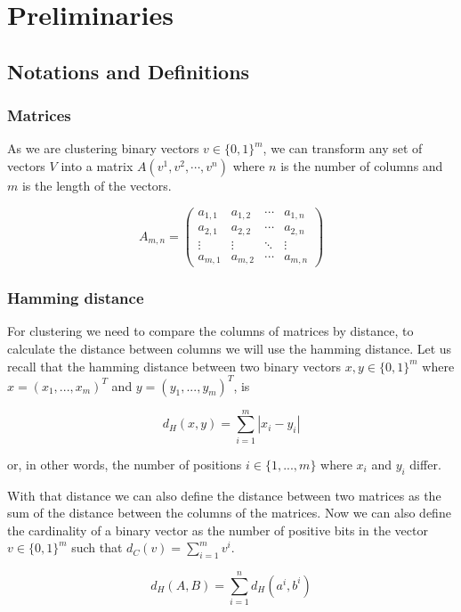 \documentclass[a4paper]{article}
\begin{document}
%
%

\newpage

\section{Preliminaries}
\label{sec:prelim}
\subsection{Notations and Definitions}
\subsubsection{Matrices}
As we are clustering binary vectors $v \in \{0,1\}^m$, we can transform any set of vectors
$V$ into a matrix $A(v^1, v^2, \cdots, v^n)$ where $n$ is the number of columns
and $m$ is the length of the vectors.

\[
    A_{m,n} =
    \begin{pmatrix}
        a_{1,1} & a_{1,2} & \cdots & a_{1,n} \\
        a_{2,1} & a_{2,2} & \cdots & a_{2,n} \\
        \vdots  & \vdots  & \ddots & \vdots  \\
        a_{m,1} & a_{m,2} & \cdots & a_{m,n}
    \end{pmatrix}
\]

\subsubsection{Hamming distance}
For clustering we need to compare the columns of matrices by distance, to calculate the distance
between columns we will use the hamming distance. Let us recall that the hamming distance
between two binary vectors $x,y \in \{0,1\}^m$ where $x=(x_1,...,x_m)^T$ and
$y=(y_1,...,y_m)^T$, is

\[
    d_H(x,y)= \sum_{i = 1}^{m} |x_i - y_i|
\]

or, in other words, the number of positions $i \in \{1,...,m\}$ where $x_i$ and $y_i$ differ.

With that distance we can
also define the distance between two matrices as the sum of the distance between the columns of
the matrices. Now we can also define the cardinality of a binary vector as the number of positive bits in
the vector $v \in \{0,1\}^m$ such that $d_C(v)=\sum_{i = 1}^{m} v^i$.

\[
    d_H(A,B) = \sum_{i = 1}^{n} d_H(a^i, b^i)
\]
\end{document}
